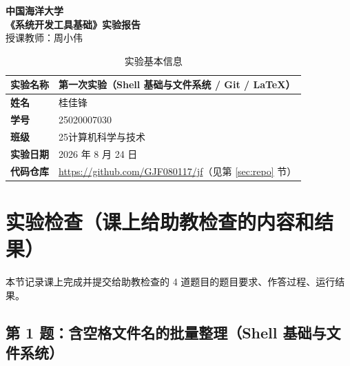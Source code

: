 \documentclass[12pt,a4paper]{article}
\newcommand{\CourseName}{系统开发工具基础}
\begin{document}
\begin{center}
    {\LARGE\bfseries 中国海洋大学}\\[6pt]
    {\Large\bfseries 《\CourseName》实验报告}\\[6pt]
    {\normalsize 授课教师：周小伟}
\end{center}

\vspace{0.5em}

\begin{table}[H]
    \centering
    \renewcommand{\arraystretch}{1.6}
    \begin{tabular}{>{\bfseries}p{3.2cm}p{11.5cm}}
        \toprule
        实验名称 & 第一次实验（Shell 基础与文件系统 / Git / LaTeX） \\
        \midrule
        姓名     & 桂佳锋 \\
        学号     & 25020007030 \\
        班级     & 25计算机科学与技术 \\
        实验日期 & 2026 年 8 月 24 日 \\
        代码仓库 & \url{https://github.com/GJF080117/jf}（见第 \ref{sec:repo} 节） \\
        \bottomrule
    \end{tabular}
    \caption{实验基本信息}
    \label{tab:info}
\end{table}

\section{实验检查（课上给助教检查的内容和结果）}

本节记录课上完成并提交给助教检查的 4 道题目的题目要求、作答过程、运行结果。

\subsection{第 1 题：含空格文件名的批量整理（Shell 基础与文件系统）}
\end{document}
